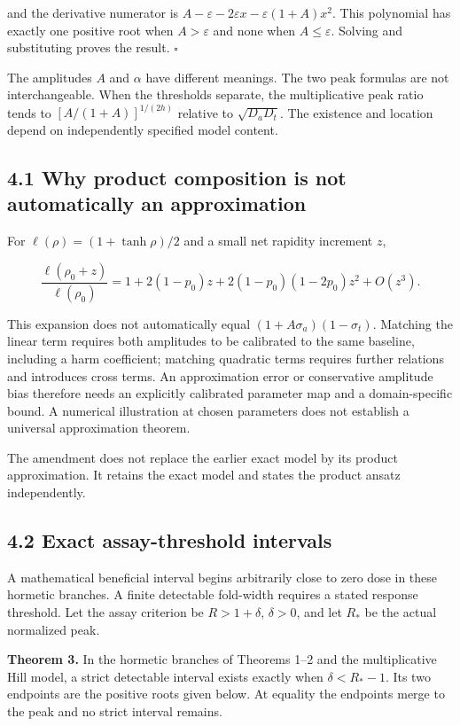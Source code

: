 \documentclass[
  11pt,
  a4paper,
]{article}
\begin{document}
and the derivative numerator is \(A-\varepsilon-2\varepsilon x-\varepsilon(1+A)x^2\). This polynomial has exactly one positive root when \(A>\varepsilon\) and none when \(A\le\varepsilon\). Solving and substituting proves the result. \(\square\)

The amplitudes \(A\) and \(\alpha\) have different meanings. The two peak formulas are not interchangeable. When the thresholds separate, the multiplicative peak ratio tends to \([A/(1+A)]^{1/(2h)}\) relative to \(\sqrt{D_aD_t}\). The existence and location depend on independently specified model content.

\subsection{4.1 Why product composition is not automatically an approximation}\label{why-product-composition-is-not-automatically-an-approximation}

For \(\ell(\rho)=(1+\tanh\rho)/2\) and a small net rapidity increment \(z\),

\[\frac{\ell(\rho_0+z)}{\ell(\rho_0)}
=1+2(1-p_0)z+2(1-p_0)(1-2p_0)z^2+O(z^3).\]

This expansion does not automatically equal \((1+A\sigma_a)(1-\sigma_t)\). Matching the linear term requires both amplitudes to be calibrated to the same baseline, including a harm coefficient; matching quadratic terms requires further relations and introduces cross terms. An approximation error or conservative amplitude bias therefore needs an explicitly calibrated parameter map and a domain-specific bound. A numerical illustration at chosen parameters does not establish a universal approximation theorem.

The amendment does not replace the earlier exact model by its product approximation. It retains the exact model and states the product ansatz independently.

\subsection{4.2 Exact assay-threshold intervals}\label{exact-assay-threshold-intervals}

A mathematical beneficial interval begins arbitrarily close to zero dose in these hormetic branches. A finite detectable fold-width requires a stated response threshold. Let the assay criterion be \(R>1+\delta\), \(\delta>0\), and let \(R_*\) be the actual normalized peak.

\textbf{Theorem 3.} In the hormetic branches of Theorems 1--2 and the multiplicative Hill model, a strict detectable interval exists exactly when \(\delta<R_*-1\). Its two endpoints are the positive roots given below. At equality the endpoints merge to the peak and no strict interval remains.
\end{document}
